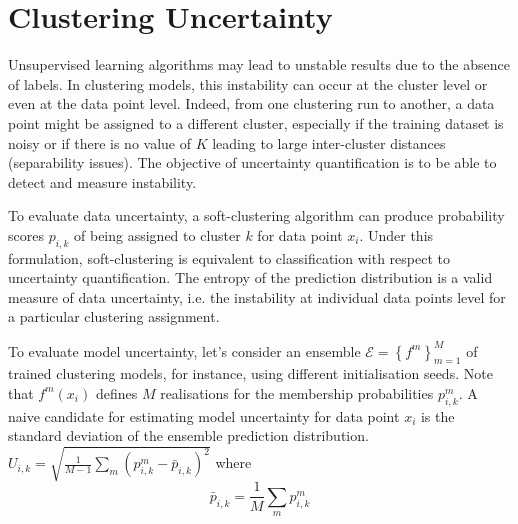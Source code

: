 \chapter{Clustering Uncertainty}
Unsupervised learning algorithms may lead to unstable results due to the absence of labels. In clustering models, this instability can occur at the cluster level or even at the data point level. Indeed, from one clustering run to another, a data point might be assigned to a different cluster, especially if the training dataset is noisy or if there is no value of $K$ leading to large inter-cluster distances (separability issues).  The objective of uncertainty quantification is to be able to detect and measure instability. 



To evaluate data uncertainty, a soft-clustering algorithm can produce probability scores $ p_{i,k} $ of being assigned to cluster $k$ for data point $x_i$. Under this formulation, soft-clustering is equivalent to classification with respect to uncertainty quantification. The entropy of the prediction distribution is a valid measure of data uncertainty, i.e. the instability at individual data points level for a particular clustering assignment.


To evaluate model uncertainty, let's consider an ensemble $ \mathcal{E} = \left\{f^m\right\}_{m = 1}^{M}$ of trained clustering models, for instance, using different initialisation seeds. Note  that $f^m(x_i)$ defines $M$ realisations for the membership probabilities $p_{i,k}^m$. A naive candidate for estimating model uncertainty for data point $x_i$ is the standard deviation of the ensemble prediction distribution.
$
U_{i,k} = \sqrt{\frac{1}{M-1} \sum_m \left (p_{i,k}^m -  \bar{p}_{i,k} \right)^2 }
$
where
\begin{equation} \label{eq:average-membership-proba}
    \bar{p}_{i,k} = \frac{1}{M} \sum_m p_{i,k}^m
\end{equation}

